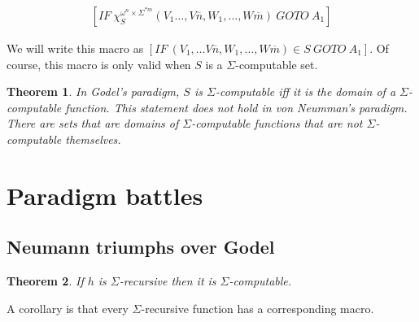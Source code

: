 \documentclass[a4paper, 12pt]{article}
\newtheorem{theorem}{Theorem}
\newtheorem{theorem}{Theorem}
\begin{document}
\begin{align*}
    \left[ IF ~ \chi_S^{\omega^n \times \Sigma^{*m}} \left( V_1 \ldots, V
    \overline{n}, W_1, \ldots, W \overline{m} \right) ~ GOTO ~ A_1  \right] 
\end{align*}

We will write this macro as $\left[ IF ~ (V_1, \ldots V \overline{n}, W_1, \ldots,
W \overline{m}) \in S ~ GOTO ~ A_1 \right] $. Of course, this macro is only
valid when $S$ is a $\Sigma$-computable set.

\begin{theorem}
    In Godel's paradigm, $S$ is $\Sigma$-computable iff it is the domain of a
    $\Sigma$-computable function. This statement \textit{does not hold} in von
    Neumman's paradigm. There are sets that are domains of $\Sigma$-computable
    functions that are not $\Sigma$-computable themselves.
\end{theorem}

\pagebreak 

\section{Paradigm battles}

\subsection{Neumann triumphs over Godel}

\begin{theorem}
    If $h$ is $\Sigma$-recursive then it is $\Sigma$-computable.
\end{theorem}

A corollary is that every $\Sigma$-recursive function has a corresponding macro.
\end{document}
